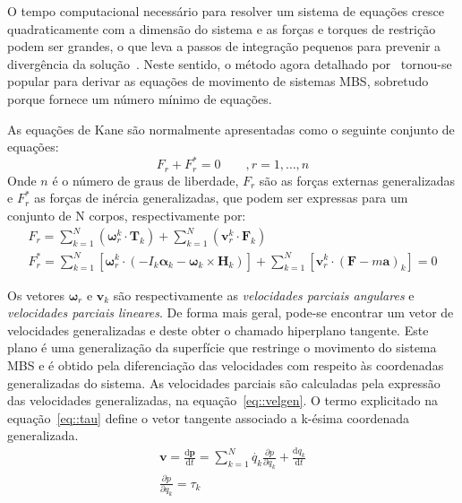 O tempo computacional necessário para resolver um sistema de equações cresce
quadraticamente com a dimensão do sistema e as forças e torques de restrição
podem ser grandes, o que leva a passos de integração pequenos para prevenir a
divergência da solução~\cite{stoneking2013implementation}. Neste sentido, o
método agora detalhado por~\citet{kane1985dynamics} tornou-se popular para
derivar as equações de movimento de sistemas MBS, sobretudo porque fornece um
número mínimo de equações.

As equações de Kane são normalmente apresentadas como o seguinte conjunto de
equações:
%
\begin{equation} \label{eq::kane}
	F_r + F_r^{*} = 0 \qquad, r = 1,\ldots,n
\end{equation}
%
Onde $n$ é o número de graus de liberdade, $F_r$ são as forças externas
generalizadas e $F_r^{*}$ as forças de inércia generalizadas, que podem ser
expressas para um conjunto de N corpos, respectivamente por:
%
\begin{gather}
	F_r = \sum_{k=1}^{N}(\boldsymbol{\omega}_r^k \cdot \mathbf{T}_k) +
\sum_{k=1}^{N}(\mathbf{v}_r^k \cdot \mathbf{F}_k) \\
	F_r^{*} = \sum_{k=1}^{N}\left[\boldsymbol{\omega}_r^k \cdot (-I_k
\boldsymbol{\alpha}_k - \boldsymbol{\omega}_k \times \mathbf{H}_k)\right] +
\sum_{k=1}^{N}\left[ \mathbf{v}_r^k \cdot (\mathbf{F} - m \mathbf{a})_k \right]
= 0
\end{gather}
%

Os vetores $\boldsymbol{\omega}_r$ e $\mathbf{v}_k$ são respectivamente as
\emph{velocidades parciais angulares} e \emph{velocidades parciais lineares}. De
forma mais geral, pode-se encontrar um vetor de velocidades generalizadas e
deste obter o chamado hiperplano tangente.
Este plano é uma generalização da superfície que restringe o movimento do
sistema MBS e é obtido pela diferenciação das velocidades com respeito às
coordenadas generalizadas do sistema. As velocidades parciais são calculadas
pela expressão das velocidades generalizadas, na equação~\ref{eq::velgen}. O
termo explicitado na equação~\ref{eq::tau} define o vetor tangente associado a
k-ésima coordenada generalizada.
%
\begin{gather}
	\mathbf{v} = \frac{\mathrm{d} \mathbf{p}}{\mathrm{d} t} = \sum_{k=1}^{N}
	\dot{q_{k}} \frac{\partial p}{\partial q_{k}} + \frac{\mathrm{d}
	q_{k}}{\mathrm{d} t} \label{eq::velgen}\\
	\frac{\partial p}{\partial q_{k}} = \tau_{k} \label{eq::tau}
\end{gather}
%

